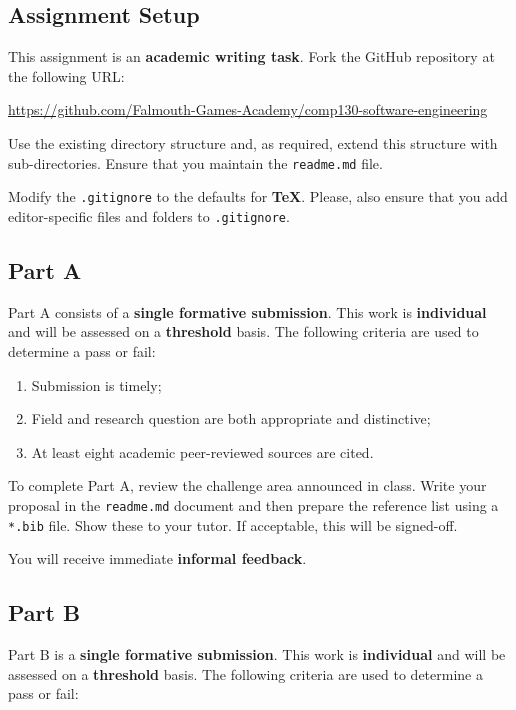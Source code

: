 \documentclass{../../fal_assignment}
\begin{document}
\subsection*{Assignment Setup}

This assignment is an \textbf{academic writing task}. Fork the GitHub repository at the following URL:

\indent \url{https://github.com/Falmouth-Games-Academy/comp130-software-engineering}

Use the existing directory structure and, as required, extend this structure with sub-directories. Ensure that you maintain the \texttt{readme.md} file.

Modify the \texttt{.gitignore} to the defaults for \textbf{TeX}. Please, also ensure that you add editor-specific files and folders to \texttt{.gitignore}. 

\subsection*{Part A}

Part A consists of a \textbf{single formative submission}. This work is \textbf{individual} and will be assessed on a \textbf{threshold} basis. The following criteria are used to determine a pass or fail:

\begin{enumerate}[label=(\alph*)]
	\item Submission is timely;
	\item Field and research question are both appropriate and distinctive;
	\item At least eight academic peer-reviewed sources are cited.
\end{enumerate}

To complete Part A, review the challenge area announced in class. Write your proposal in the \texttt{readme.md} document and then prepare the reference list using a \texttt{*.bib} file.  Show these to your tutor.  If acceptable, this will be signed-off. 

You will receive immediate \textbf{informal feedback}.

\subsection*{Part B}

Part B is a \textbf{single formative submission}. This work is \textbf{individual} and will be assessed on a \textbf{threshold} basis. The following criteria are used to determine a pass or fail:
\end{document}
